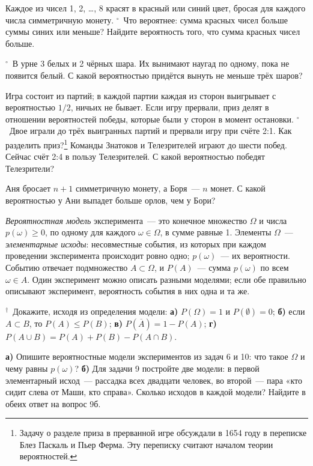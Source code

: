 \z Каждое из чисел 1, 2, \ldots, 8 красят в красный или синий цвет, бросая для каждого числа симметричную монету.
 \unskip$^{\circ}$\ Что вероятнее: сумма красных чисел больше суммы синих или меньше?
 Найдите вероятность того, что сумма красных чисел больше.

\zp \unskip$^{\circ}$\ В урне 3 белых и 2 чёрных шара. Их вынимают наугад по одному, пока не появится белый. С какой вероятностью придётся вынуть не меньше трёх шаров?

\z Игра состоит из партий; в каждой партии каждая из сторон выигрывает с вероятностью $1/2$, ничьих не бывает. Если игру прервали, приз делят в отношении вероятностей победы, которые были у сторон в момент остановки.
 \unskip$^{\circ}$\ Двое играли до трёх выигранных партий и прервали игру при счёте 2:1. Как разделить приз?\footnote{Задачу о разделе приза в прерванной игре обсуждали в 1654 году в переписке Блез Паскаль и Пьер Ферма. Эту переписку считают началом теории вероятностей.}
 Команды Знатоков и Телезрителей играют до шести побед. Сейчас счёт 2:4 в пользу Телезрителей. С какой вероятностью победят Телезрители?

\zp Аня бросает $n+1$ симметричную монету, а Боря~— $n$ монет. С какой вероятностью у Ани выпадет больше орлов, чем у Бори?

\divby

\textit{Вероятностная модель} эксперимента~— это конечное множество $\Omega$ и числа $p(\omega)\ge 0$, по одному для каждого $\omega\in\Omega$, в сумме равные 1. Элементы $\Omega$~— \textit{элементарные исходы}: несовместные события, из которых при каждом проведении эксперимента происходит ровно одно; $p(\omega)$~— их вероятности. Событию отвечает подмножество $A\subset\Omega$, и $P(A)$~— сумма $p(\omega)$ по всем $\omega\in A$. Один эксперимент можно описать разными моделями; если обе правильно описывают эксперимент, вероятность события в них одна и та же.

\zp \unskip$^{\dag}$\ Докажите, исходя из определения модели: \textbf{а)} $P(\Omega)=1$ и $P(\emptyset)=0$; \textbf{б)} если $A\subset B$, то $P(A)\le P(B)$; \textbf{в)} $P(\overline{A})=1-P(A)$; \textbf{г)} $P(A\cup B)=P(A)+P(B)-P(A\cap B)$.

\zp \textbf{а)} Опишите вероятностные модели экспериментов из задач 6 и 10: что такое $\Omega$ и чему равны $p(\omega)$? \textbf{б)} Для задачи 9 постройте две модели: в первой элементарный исход~— рассадка всех двадцати человек, во второй~— пара «кто сидит слева от Маши, кто справа». Сколько исходов в каждой модели? Найдите в обеих ответ на вопрос 9б.


